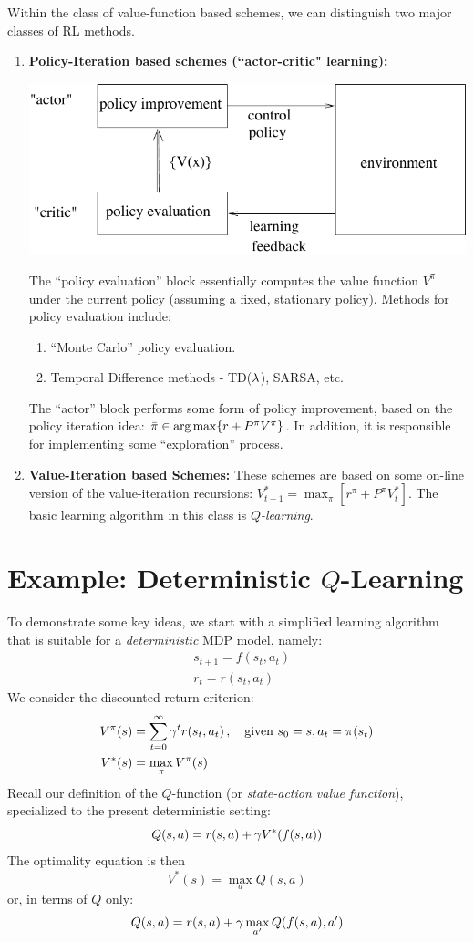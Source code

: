 Within the class of value-function based schemes, we can distinguish two
major classes of RL methods.

\begin{enumerate}
  \item \textbf{Policy-Iteration based schemes (``actor-critic" learning):}
\begin{center}
\includegraphics{FIGS/ACRL.pdf}
\end{center}
The ``policy evaluation'' block essentially computes the value function $V^\pi$ under
the current policy (assuming a fixed, stationary policy).
Methods for policy evaluation include:
\begin{enumerate}
  \item ``{Monte Carlo}'' policy evaluation.
  \item Temporal Difference methods - {TD($\lambda$)}, SARSA, etc.
\end{enumerate}
The ``actor'' block performs some form of policy improvement, based on the
policy iteration idea:
$\bar{\pi} \in \argmax \{r+P^\pi V^\pi\}$.
In addition, it is responsible for implementing some ``exploration'' process.

\item \textbf{Value-Iteration based Schemes:}
These schemes are based on some on-line version of the value-iteration recursions:
$V_{t+1}^* = \max_\pi [r^{\pi}+P^{\pi} V_t^*]$.
The basic learning algorithm in this class is {\em $Q$-learning}.
\end{enumerate}

\section{Example: Deterministic $Q$-Learning}

To demonstrate some key ideas, we start with a simplified learning algorithm
that is suitable for a {\em deterministic} MDP model, namely:
\begin{align*}
& s_{t+1}=f(s_t,a_t) \\
& r_t=r(s_t,a_t)
\end{align*}
We consider the discounted return criterion:
\begin{align*}
V^{\pi}(s) &=\sum_{t=0}^\infty \gamma^t r(s_t,a_t)\,,
\quad \text{given } s_0=s, a_t=\pi(s_t)\\
V^*(s) &= \max_\pi V^\pi(s)
\end{align*}
Recall our definition of the $Q$-function (or {\em state-action value function}),
specialized to the present deterministic setting:
$$
Q(s,a)=r(s,a)+\gamma V^*(f(s,a))
$$
The optimality equation is then
$$
V^*(s) = \max_a Q(s,a)
$$
or, in terms of $Q$ only:
$$
Q(s,a)=r(s,a)+\gamma \max_{a'}Q(f(s,a),a')
$$

